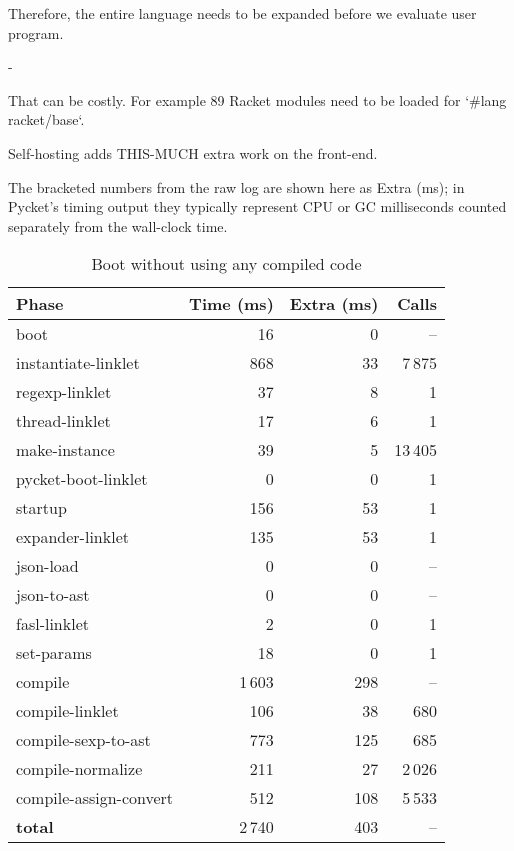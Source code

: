 		\begin{paragraph-here}
			Therefore, the entire language needs to be expanded before we evaluate user program.
		\end{paragraph-here}
-
		\begin{paragraph-here}
			That can be costly. For example 89 Racket modules need to be loaded for `\#lang racket/base`.
		\end{paragraph-here}

		\begin{paragraph-here}
			Self-hosting adds THIS-MUCH extra work on the front-end.

			The bracketed numbers from the raw log are shown here as Extra (ms); in Pycket’s timing output they typically represent CPU or GC milliseconds counted separately from the wall-clock time.
		\end{paragraph-here}

		\begin{table}[ht]
		\centering
		\begin{tabular}{@{}lrrr@{}}
			\toprule
			Phase & Time (ms) & Extra (ms) & Calls \\ \midrule
			boot                           &     16 &    0 & -- \\
			instantiate-linklet            &    868 &   33 & 7\,875 \\
			regexp-linklet                 &     37 &    8 & 1 \\
			thread-linklet                 &     17 &    6 & 1 \\
			make-instance                  &     39 &    5 & 13\,405 \\
			pycket-boot-linklet            &      0 &    0 & 1 \\
			startup                        &    156 &   53 & 1 \\
			\quad expander-linklet         &    135 &   53 & 1 \\
			\quad json-load                &      0 &    0 & -- \\
			\quad json-to-ast              &      0 &    0 & -- \\
			\quad fasl-linklet             &      2 &    0 & 1 \\
			\quad set-params               &     18 &    0 & 1 \\ \midrule
			compile                        &  1\,603 &  298 & -- \\
			\quad compile-linklet          &    106 &   38 & 680 \\
			\quad compile-sexp-to-ast      &    773 &  125 & 685 \\
			\quad compile-normalize        &    211 &   27 & 2\,026 \\
			\quad compile-assign-convert   &    512 &  108 & 5\,533 \\ \midrule
			\textbf{total}                 &  2\,740 &  403 & -- \\
			\bottomrule
		\end{tabular}
		\caption{Boot without using any compiled code}
		\label{tab:boot-no-compiled}
		\end{table}


